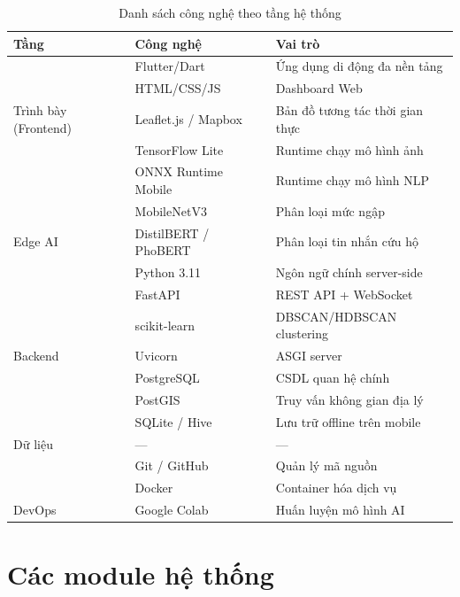 \documentclass[12pt, a4paper]{report}
\begin{document}
\begin{table}[H]
\centering
\caption{Danh sách công nghệ theo tầng hệ thống}
\label{tab:tech-stack}
\begin{tabular}{llp{5.5cm}}
\toprule
\textbf{Tầng} & \textbf{Công nghệ} & \textbf{Vai trò} \\
\midrule
  & Flutter/Dart & Ứng dụng di động đa nền tảng \\
  & HTML/CSS/JS & Dashboard Web \\
  \multirow{-3}{*}{Trình bày (Frontend)} & Leaflet.js / Mapbox & Bản đồ tương tác thời gian thực \\
\midrule
  & TensorFlow Lite & Runtime chạy mô hình ảnh \\
  & ONNX Runtime Mobile & Runtime chạy mô hình NLP \\
  & MobileNetV3 & Phân loại mức ngập \\
  \multirow{-4}{*}{Edge AI} & DistilBERT / PhoBERT & Phân loại tin nhắn cứu hộ \\
\midrule
  & Python 3.11 & Ngôn ngữ chính server-side \\
  & FastAPI & REST API + WebSocket \\
  & scikit-learn & DBSCAN/HDBSCAN clustering \\
  \multirow{-4}{*}{Backend} & Uvicorn & ASGI server \\
\midrule
  & PostgreSQL & CSDL quan hệ chính \\
  & PostGIS & Truy vấn không gian địa lý \\
  & SQLite / Hive & Lưu trữ offline trên mobile \\
  \multirow{-4}{*}{Dữ liệu} & — & — \\
\midrule
  & Git / GitHub & Quản lý mã nguồn \\
  & Docker & Container hóa dịch vụ \\
  \multirow{-3}{*}{DevOps} & Google Colab & Huấn luyện mô hình AI \\
\bottomrule
\end{tabular}
\end{table}

\chapter{Các module hệ thống}
\end{document}
